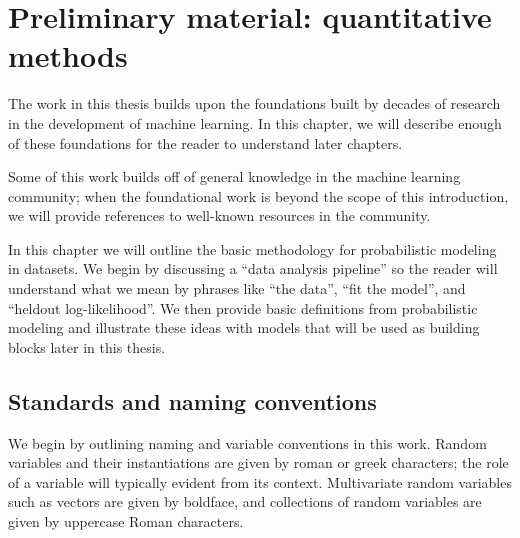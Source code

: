 \chapter{Preliminary material: quantitative methods}
\label{chapter:introductory_material}

The work in this thesis builds upon the foundations built by decades
of research in the development of machine learning.  In this chapter,
we will describe enough of these foundations for the reader to
understand later chapters.

Some of this work builds off of general knowledge in the machine
learning community; when the foundational work is beyond the scope of
this introduction, we will provide references to well-known resources
in the community.

In this chapter we will outline the basic methodology for
probabilistic modeling in datasets.  We begin by discussing a ``data
analysis pipeline'' so the reader will understand what we mean by
phrases like ``the data'', ``fit the model'', and ``heldout
log-likelihood''.  We then provide basic definitions from
probabilistic modeling and illustrate these ideas with models that
will be used as building blocks later in this thesis.

\section{Standards and naming conventions}
We begin by outlining naming and variable conventions in this work.
Random variables and their instantiations are given by roman or greek
characters; the role of a variable will typically evident from its
context.  Multivariate random variables such as vectors are given by
boldface, and collections of random variables are given by uppercase
Roman characters.

